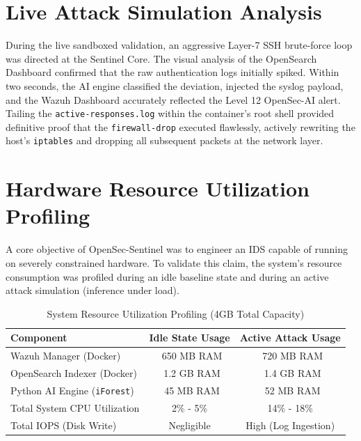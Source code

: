\documentclass[12pt, a4paper]{report}
\begin{document}
	\section{Live Attack Simulation Analysis}
	During the live sandboxed validation, an aggressive Layer-7 SSH brute-force loop was directed at the Sentinel Core. The visual analysis of the OpenSearch Dashboard confirmed that the raw authentication logs initially spiked. Within two seconds, the AI engine classified the deviation, injected the syslog payload, and the Wazuh Dashboard accurately reflected the Level 12 OpenSec-AI alert. Tailing the \texttt{active-responses.log} within the container's root shell provided definitive proof that the \texttt{firewall-drop} executed flawlessly, actively rewriting the host's \texttt{iptables} and dropping all subsequent packets at the network layer.
	
	\section{Hardware Resource Utilization Profiling}
	A core objective of OpenSec-Sentinel was to engineer an IDS capable of running on severely constrained hardware. To validate this claim, the system's resource consumption was profiled during an idle baseline state and during an active attack simulation (inference under load).
	
	
	
	\begin{table}[H]
		\centering
		\caption{System Resource Utilization Profiling (4GB Total Capacity)}
		\vspace{0.2cm}
		\begin{tabularx}{\textwidth}{|X|c|c|}
			\hline
			\textbf{Component} & \textbf{Idle State Usage} & \textbf{Active Attack Usage} \\
			\hline
			Wazuh Manager (Docker) & ~650 MB RAM & ~720 MB RAM \\
			\hline
			OpenSearch Indexer (Docker) & ~1.2 GB RAM & ~1.4 GB RAM \\
			\hline
			Python AI Engine (\texttt{iForest}) & ~45 MB RAM & ~52 MB RAM \\
			\hline
			Total System CPU Utilization & 2\% - 5\% & 14\% - 18\% \\
			\hline
			Total IOPS (Disk Write) & Negligible & High (Log Ingestion) \\
			\hline
		\end{tabularx}
	\end{table}
	
\end{document}
